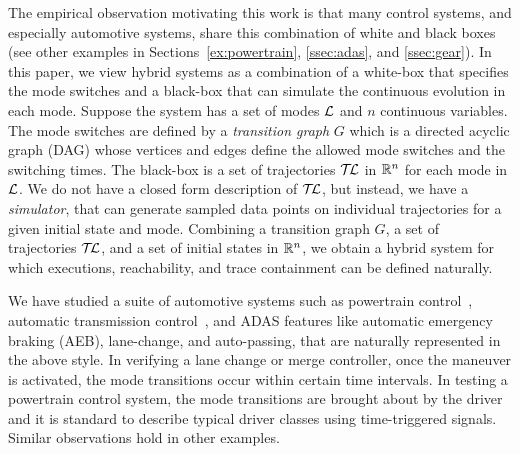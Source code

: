 The empirical observation motivating this work is that many  control systems, and especially automotive systems, share this  combination of  white  and  black boxes (see other examples in Sections~\ref{ex:powertrain}, \ref{ssec:adas}, and \ref{ssec:gear}).
 In this paper, we view hybrid systems as a combination of a white-box that specifies the mode switches and a black-box that can  simulate the continuous evolution in each mode. 
 Suppose the system has a set of modes ${\mathcal L}$ and $n$ continuous variables. The mode switches are defined by a {\em transition graph} $G$ which is a directed acyclic graph (DAG) whose vertices and edges define the allowed mode switches and the switching times. The black-box is a set of trajectories $\mathcal{T\mkern-3mu L}$ in $\reals^n$ for each mode in ${\mathcal L}$. 
 We do not have a closed form description of $\mathcal{T\mkern-3mu L}$, but instead, we have a {\em simulator\/}, that can generate sampled data points on individual trajectories for a given initial state and mode.  
%
Combining a transition graph $G$, a set of trajectories $\mathcal{T\mkern-3mu L}$, and a
set of initial states in $\reals^n$, we obtain a hybrid system for
which executions, reachability, and trace containment can be defined
naturally.

 
We have studied a suite of automotive systems such as powertrain
control~\cite{jin2014powertrain}, automatic transmission
control~\cite{Matlab_trans}, and ADAS features like automatic
emergency braking (AEB), lane-change, and auto-passing, that
are naturally represented in the above style. In verifying a lane
change or merge controller, once the maneuver is activated, the mode
transitions occur within certain time intervals. In testing a
powertrain control system, the mode transitions are brought about by
the driver and it is standard to describe typical driver classes using
time-triggered signals. Similar observations hold in other examples.
 

 


\vspace{-10pt}
